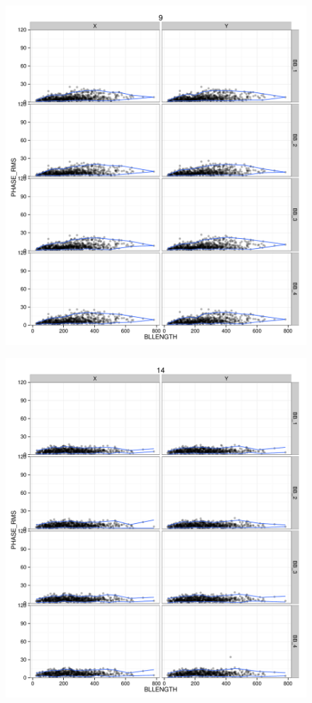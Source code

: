 \documentclass[10pt,]{article}
\begin{document}
\begin{figure}[htbp]
\centering
\includegraphics{QA0rep_files/figure-latex/unnamed-chunk-12-2.pdf}
\caption{}
\end{figure}

\begin{figure}[htbp]
\centering
\includegraphics{QA0rep_files/figure-latex/unnamed-chunk-12-3.pdf}
\caption{}
\end{figure}
\end{document}
